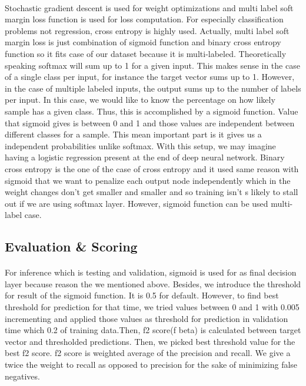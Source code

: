 \documentclass[12pt]{article}
\begin{document}
\paragraph{}Stochastic gradient descent is used for weight optimizations and multi label soft margin loss function is used for loss computation. For especially classification problems not regression, cross entropy is highly used. Actually, multi label soft margin loss is just combination of sigmoid function and binary cross entropy function so it fits case of our dataset because it is multi-labeled. Theoretically speaking softmax will sum up to 1 for a given input. This makes sense in the case of a single class per input, for instance the target vector sums up to 1. However, in the case of multiple labeled inputs, the output sums up to the number of labels per input. In this case, we would like to know the percentage on how likely sample has a given class. Thus, this is accomplished by a sigmoid function. Value that sigmoid gives is between 0 and 1 and those values are independent between different classes for a sample. This mean important part is it gives us a independent probabilities unlike softmax. With this setup, we may imagine having a logistic regression present at the end of deep neural network. Binary cross entropy is the one of the case of cross entropy and it used same reason with sigmoid that we want to penalize each output node independently which in the weight changes don’t get smaller and smaller and so training isn’t s likely to stall out if we are using softmax layer. However, sigmoid function can be used multi-label case.
\subsection{Evaluation \& Scoring}
\paragraph{}For inference which is testing and validation, sigmoid is used for as final decision layer because reason the we mentioned above. Besides, we introduce the threshold for result of the sigmoid function. It is 0.5 for default. However, to find best threshold for prediction for that time, we tried values between 0 and 1 with 0.005 incrementing and applied those values as threshold for prediction in validation time which 0.2 of training data.Then, f2 score(f beta) is calculated between target vector and thresholded predictions. Then, we picked best threshold value for the best f2 score. f2 score is weighted average of the precision and recall. We give a twice the weight to recall as opposed to precision for the sake of minimizing false negatives.   
\end{document}
